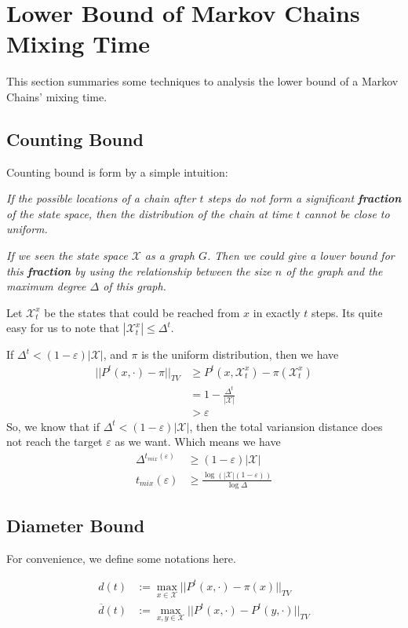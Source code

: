 \section{Lower Bound of Markov Chains Mixing Time}
This section summaries some techniques to analysis the lower bound of a Markov Chains' mixing time.
\subsection{Counting Bound}
Counting bound is form by a simple intuition:

\emph{If the possible locations of a chain after $t$ steps do not form a significant \textbf{fraction} of the state space, then the distribution of the chain at time $t$ cannot be close to uniform.}

\emph{If we seen the state space $\mathcal{X}$ as a graph $G$. Then we could give a lower bound for this \textbf{fraction} by using the relationship between the size $n$ of the graph and the maximum degree $\Delta$ of this graph.}


\begin{define}
Let $\mathcal{X}_t^x$ be the states that could be reached from $x$ in exactly $t$ steps.
Its quite easy for us to note that $|\mathcal{X}_t^x|\leq \Delta^t$.
\end{define}
If $\Delta^t< (1-\varepsilon)|\mathcal{X}|$, and $\pi$ is the uniform distribution, then we have
\begin{align*}
  ||P^t(x,\cdot) - \pi||_{TV} &\geq P^t(x,\mathcal{X}_t^x)  - \pi(\mathcal{X}_t^x) \\
  &= 1 - \frac{\Delta^t}{|\mathcal{X}|} \\
  &> \varepsilon
\end{align*}
So, we know that if $\Delta^t < (1-\varepsilon)|\mathcal{X}|$, then the total variansion distance does not reach the target $\varepsilon$ as we want.
Which means we have
\begin{align*}
  \Delta^{t_{mix}(\varepsilon)} &\geq (1-\varepsilon)|\mathcal{X}| \\
  t_{mix}(\varepsilon) &\geq \frac{\log(|\mathcal{X}|(1-\varepsilon))}{\log\Delta}
\end{align*}

\subsection{Diameter Bound}
For convenience, we define some notations here.
\begin{define}
  \begin{align*}
    d(t) &:= \max_{x\in\mathcal{X}}||P^t(x, \cdot) - \pi(x)||_{TV} \\
    \overline{d}(t) &:= \max_{x,y\in\mathcal{X}}||P^t(x,\cdot) - P^t(y,\cdot)||_{TV}
  \end{align*}
\end{define}

